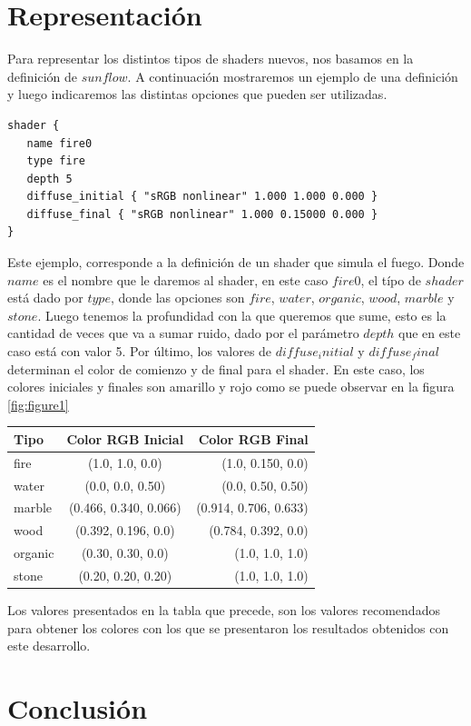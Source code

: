 \documentclass[a4paper,10pt]{article}
\begin{document}
\section{Representación}
\label{representacion}

Para representar los distintos tipos de shaders nuevos, nos basamos en la
definición de $sunflow$. A continuación mostraremos un ejemplo de una
definición y luego indicaremos las distintas opciones que pueden ser utilizadas.

\begin{verbatim}
shader {
   name fire0
   type fire
   depth 5
   diffuse_initial { "sRGB nonlinear" 1.000 1.000 0.000 }
   diffuse_final { "sRGB nonlinear" 1.000 0.15000 0.000 }
}                         
\end{verbatim}

Este ejemplo, corresponde a la definición de un shader que simula el fuego.
Donde $name$ es el nombre que le daremos al shader, en este caso $fire0$, el
típo de $shader$ está dado por $type$, donde las opciones son $fire$, $water$,
$organic$, $wood$, $marble$ y $stone$.  Luego tenemos la profundidad con la que
queremos que sume, esto es la cantidad de veces que va a sumar ruido, dado por
el parámetro $depth$ que en este caso está con valor 5.  Por último, los
valores de $diffuse_initial$ y $diffuse_final$ determinan el color de comienzo
y de final para el shader.  En este caso, los colores iniciales y finales son
amarillo y rojo como se puede observar en la figura \ref{fig:figure1}

\begin{center}
  \begin{tabular}{ | l || c | r | }
    \hline                       
    Tipo & Color RGB Inicial & Color RGB Final \\
    \hline
    \hline
    fire & (1.0, 1.0, 0.0) & (1.0, 0.150, 0.0) \\
    water & (0.0, 0.0, 0.50) & (0.0, 0.50, 0.50) \\
    marble & (0.466, 0.340, 0.066) & (0.914, 0.706, 0.633) \\
    wood & (0.392, 0.196, 0.0) & (0.784, 0.392, 0.0)
\\
    organic & (0.30, 0.30, 0.0) & (1.0, 1.0, 1.0) \\
    stone & (0.20, 0.20, 0.20) & (1.0, 1.0, 1.0) \\
    \hline  
  \end{tabular}
\end{center}

Los valores presentados en la tabla que precede, son los valores recomendados
para obtener los colores con los que se presentaron los resultados obtenidos
con este desarrollo.


\section{Conclusión}
\label{conclusiones}
\end{document}
